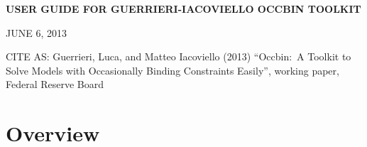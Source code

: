 \documentclass[12pt]{article}
\begin{document}
\setcounter{secnumdepth}{-1}%

\renewcommand{\baselinestretch}{1.05}
\normalsize%

\begin{center}
\textbf{USER GUIDE FOR GUERRIERI-IACOVIELLO OCCBIN TOOLKIT}

JUNE 6, 2013
\end{center}

CITE AS: Guerrieri, Luca, and Matteo Iacoviello (2013) ``Occbin:\ A Toolkit
to Solve Models with Occasionally Binding Constraints Easily'', working
paper, Federal Reserve Board

\bigskip

\section{Overview}
\end{document}
